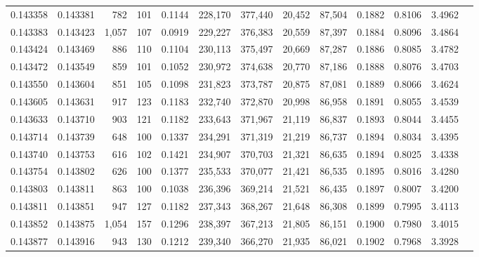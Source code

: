 \begin{tabular}{rrrrrrrrrrrrr}
0.143358 & 0.143381 &   782 & 101 &                                     0.1144 & 228,170 & 377,440 &  20,452 &  87,504 & 0.1882 & 0.8106 & 3.4962 \\
0.143383 & 0.143423 & 1,057 & 107 &                                     0.0919 & 229,227 & 376,383 &  20,559 &  87,397 & 0.1884 & 0.8096 & 3.4864 \\
0.143424 & 0.143469 &   886 & 110 &                                     0.1104 & 230,113 & 375,497 &  20,669 &  87,287 & 0.1886 & 0.8085 & 3.4782 \\
0.143472 & 0.143549 &   859 & 101 &                                     0.1052 & 230,972 & 374,638 &  20,770 &  87,186 & 0.1888 & 0.8076 & 3.4703 \\
0.143550 & 0.143604 &   851 & 105 &                                     0.1098 & 231,823 & 373,787 &  20,875 &  87,081 & 0.1889 & 0.8066 & 3.4624 \\
0.143605 & 0.143631 &   917 & 123 &                                     0.1183 & 232,740 & 372,870 &  20,998 &  86,958 & 0.1891 & 0.8055 & 3.4539 \\
0.143633 & 0.143710 &   903 & 121 &                                     0.1182 & 233,643 & 371,967 &  21,119 &  86,837 & 0.1893 & 0.8044 & 3.4455 \\
0.143714 & 0.143739 &   648 & 100 &                                     0.1337 & 234,291 & 371,319 &  21,219 &  86,737 & 0.1894 & 0.8034 & 3.4395 \\
0.143740 & 0.143753 &   616 & 102 &                                     0.1421 & 234,907 & 370,703 &  21,321 &  86,635 & 0.1894 & 0.8025 & 3.4338 \\
0.143754 & 0.143802 &   626 & 100 &                                     0.1377 & 235,533 & 370,077 &  21,421 &  86,535 & 0.1895 & 0.8016 & 3.4280 \\
0.143803 & 0.143811 &   863 & 100 &                                     0.1038 & 236,396 & 369,214 &  21,521 &  86,435 & 0.1897 & 0.8007 & 3.4200 \\
0.143811 & 0.143851 &   947 & 127 &                                     0.1182 & 237,343 & 368,267 &  21,648 &  86,308 & 0.1899 & 0.7995 & 3.4113 \\
0.143852 & 0.143875 & 1,054 & 157 &                                     0.1296 & 238,397 & 367,213 &  21,805 &  86,151 & 0.1900 & 0.7980 & 3.4015 \\
0.143877 & 0.143916 &   943 & 130 &                                     0.1212 & 239,340 & 366,270 &  21,935 &  86,021 & 0.1902 & 0.7968 & 3.3928 \\

\end{tabular}
